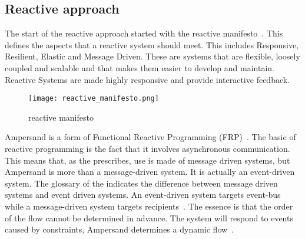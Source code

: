 \subsection{Reactive approach} \label{reactive_approach}

The start of the reactive approach started with the reactive manifesto~.
This defines the aspects that a reactive system should meet.
This includes Responsive, Resilient, Elastic and Message Driven.
These are systems that are flexible, loosely coupled and scalable and that makes them easier to develop and maintain.
Reactive Systems are made highly responsive and provide interactive feedback.
\begin{figure}[H] 
\texttt{[image: reactive\_manifesto.png]}
\centering
\caption{reactive manifesto}
\label{fig:reactive manifesto}
\end{figure}


Ampersand is a form of Functional Reactive Programming (FRP)~\citep{elliott_functional_1997}.
The basic of reactive programming is the fact that it involves asynchronous communication.
This means that, as the  prescribes, use is made of message driven systems, but Ampersand is more than a message-driven system.
It is actually an event-driven system.
The glossary of the  indicates the difference between message driven systems and event driven systems.
An event-driven system targets event-bus while a message-driven system targets recipients~\citep{bainomugisha_survey_2013}.
The essence is that the order of the flow cannot be determined in advance.
The system will respond to events caused by constraints, Ampersand determines a dynamic flow~\citep{joosten_relation_2018}.




